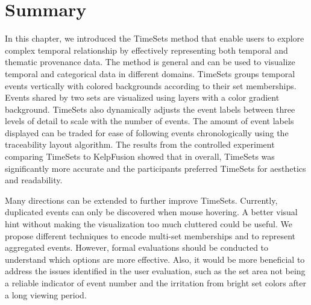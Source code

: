 \section{Summary}
In this chapter, we introduced the TimeSets method that enable users to explore complex temporal relationship by effectively representing both temporal and thematic provenance data. The method is general and can be used to visualize temporal and categorical data in different domains. TimeSets groups temporal events vertically with colored backgrounds according to their set memberships. Events shared by two sets are visualized using layers with a color gradient background. TimeSets also dynamically adjusts the event labels between three levels of detail to scale with the number of events. The amount of event labels displayed can be traded for ease of following events chronologically using the traceability layout algorithm. The results from the controlled experiment comparing TimeSets to KelpFusion showed that in overall, TimeSets was significantly more accurate and the participants preferred TimeSets for aesthetics and readability.

Many directions can be extended to further improve TimeSets. Currently, duplicated events can only be discovered when mouse hovering. A better visual hint without making the visualization too much cluttered could be useful. We propose different techniques to encode multi-set memberships and to represent aggregated events. However, formal evaluations should be conducted to understand which options are more effective. Also, it would be more beneficial to address the issues identified in the user evaluation, such as the set area not being a reliable indicator of event number and the irritation from bright set colors after a long viewing period. 